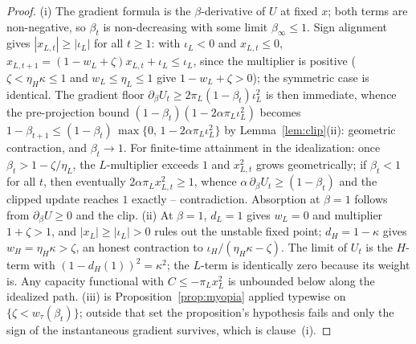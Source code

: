 \documentclass[11pt]{article}
\theoremstyle{definition}
\theoremstyle{remark}
\numberwithin{equation}{section}
\begin{document}
\begin{proof}
(i) The gradient formula is the $\beta$-derivative of $U$ at fixed $x$; both terms are non-negative, so $\beta_t$ is non-decreasing with some limit $\beta_\infty \le 1$. Sign alignment gives $|x_{L,t}| \ge |\iota_L|$ for all $t \ge 1$: with $\iota_L < 0$ and $x_{L,t} \le 0$, $x_{L,t+1} = (1-w_L+\zeta)x_{L,t} + \iota_L \le \iota_L$, since the multiplier is positive ($\zeta < \eta_H\kappa \le 1$ and $w_L \le \eta_L \le 1$ give $1 - w_L + \zeta > 0$); the symmetric case is identical. The gradient floor $\partial_\beta U_t \ge 2\pi_L(1-\beta_t)\iota_L^2$ is then immediate, whence the pre-projection bound $(1-\beta_t)(1-2\alpha\pi_L\iota_L^2)$ becomes $1-\beta_{t+1} \le (1-\beta_t)\,\max\bigl\{0,\,1 - 2\alpha\pi_L\iota_L^2\bigr\}$ by Lemma~\ref{lem:clip}(ii): geometric contraction, and $\beta_t \to 1$. For finite-time attainment in the idealization: once $\beta_t > 1 - \zeta/\eta_L$, the $L$-multiplier exceeds $1$ and $x_{L,t}^2$ grows geometrically; if $\beta_t < 1$ for all $t$, then eventually $2\alpha\pi_L x_{L,t}^2 \ge 1$, whence $\alpha\,\partial_\beta U_t \ge (1-\beta_t)$ and the clipped update reaches $1$ exactly -- contradiction. Absorption at $\beta = 1$ follows from $\partial_\beta U \ge 0$ and the clip.
(ii) At $\beta = 1$, $d_L = 1$ gives $w_L = 0$ and multiplier $1+\zeta > 1$, and $|x_L| \ge |\iota_L| > 0$ rules out the unstable fixed point; $d_H = 1-\kappa$ gives $w_H = \eta_H\kappa > \zeta$, an honest contraction to $\iota_H/(\eta_H\kappa - \zeta)$. The limit of $U_t$ is the $H$-term with $(1-d_H(1))^2 = \kappa^2$; the $L$-term is identically zero because its weight is. Any capacity functional with $C \le -\pi_L x_L^2$ is unbounded below along the idealized path.
(iii) is Proposition~\ref{prop:myopia} applied typewise on $\{\zeta < w_\tau(\beta_t)\}$; outside that set the proposition's hypothesis fails and only the sign of the instantaneous gradient survives, which is clause~(i).
\end{proof}
\end{document}
